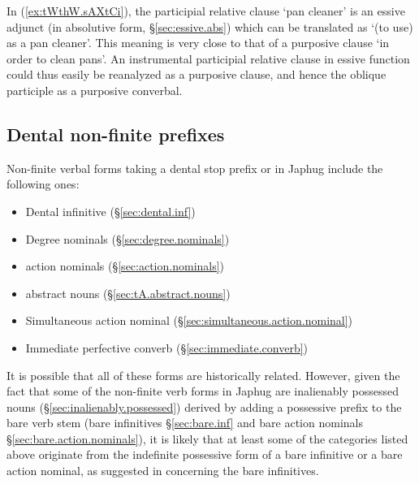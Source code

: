 In (\ref{ex:tWthW.sAXtCi}), the participial relative clause  `pan cleaner' is an essive adjunct (in absolutive form, §\ref{sec:essive.abs}) which can be translated as `(to use) as a pan cleaner'. This meaning is very close to that of a purposive clause `in order to clean pans'. An instrumental participial relative clause in essive function could thus easily be reanalyzed as a purposive clause, and hence the oblique participle as a purposive converbal.


\subsection{Dental non-finite prefixes} \label{sec:dental.nmlz.history}
Non-finite verbal forms taking a dental stop prefix  or  in Japhug include the following ones:

\begin{itemize}
\item Dental infinitive (§\ref{sec:dental.inf})
\item Degree nominals (§\ref{sec:degree.nominals})
\item {} action nominals (§\ref{sec:action.nominals})
\item {} abstract nouns (§\ref{sec:tA.abstract.nouns})
\item Simultaneous action nominal (§\ref{sec:simultaneous.action.nominal})
\item Immediate perfective converb (§\ref{sec:immediate.converb})
\end{itemize}


It is possible that all of these forms are historically related. However, given the fact that some of the non-finite verb forms in Japhug are inalienably possessed nouns (§\ref{sec:inalienably.possessed}) derived by adding a possessive prefix to the bare verb stem (bare infinitives §\ref{sec:bare.inf} and bare action nominals §\ref{sec:bare.action.nominals}), it is likely that at least some of the categories listed above originate from the indefinite possessive form of a bare infinitive or a bare action nominal, as suggested in \citet[236]{jacques16complementation} concerning the bare infinitives. 

